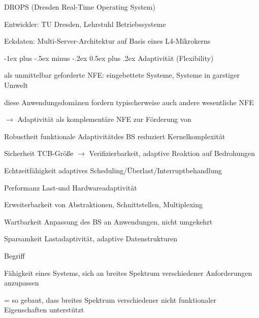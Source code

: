 \documentclass[a4paper]{article}
\makeatletter
\renewcommand{\section}{\@startsection{section}{1}{0mm}%
 {-1ex plus -.5ex minus -.2ex}%
 {0.5ex plus .2ex}%
 {\normalfont\large\bfseries}}
\makeatother
\begin{document}
\begin{multicols}{3}
    DROPS (Dresden Real-Time Operating System)
    \begin{itemize*}
        \item Entwickler: TU Dresden, Lehrstuhl Betriebssysteme
        \item Eckdaten: Multi-Server-Architektur auf Basis eines L4-Mikrokerns
    \end{itemize*}

    \section{Adaptivität (Flexibility)}
    \begin{itemize*}
        \item als unmittelbar geforderte NFE: eingebettete Systeme, Systeme in garstiger Umwelt
        \item diese Anwendungsdomänen fordern typischerweise auch andere wesentliche NFE
        \item[$\rightarrow$] Adaptivität als komplementäre NFE zur Förderung von
    \end{itemize*}
    \begin{description*}
        \item[Robustheit] funktionale Adaptivitätdes BS reduziert Kernelkomplexität %
        \item[Sicherheit] TCB-Größe $\rightarrow$ Verifizierbarkeit, adaptive Reaktion auf Bedrohungen
        \item[Echtzeitfähigkeit] adaptives Scheduling/Überlast/Interruptbehandlung
        \item[Performanz] Last-und Hardwareadaptivität
        \item[Erweiterbarkeit] von Abstraktionen, Schnittstellen, Multiplexing
        \item[Wartbarkeit] Anpassung des BS an Anwendungen, nicht umgekehrt
        \item[Sparsamkeit] Lastadaptivität, adaptive Datenstrukturen
    \end{description*}
    \begin{itemize*}
        \item Begriff
        \begin{itemize*}
            \item Fähigkeit eines Systems, sich an breites Spektrum verschiedener Anforderungen anzupassen
            \item[=] so gebaut, dass breites Spektrum verschiedener nicht funktionaler Eigenschaften unterstützt

\end{itemize*}
\end{itemize*}
\end{multicols}
\end{document}

